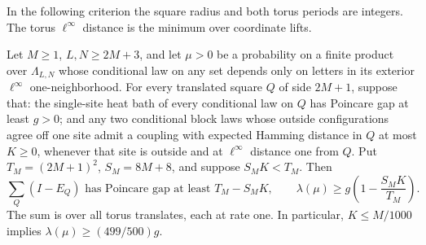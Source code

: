 In the following criterion the square radius and both torus periods
are integers.  The torus \(\ell^\infty\) distance is the minimum
over coordinate lifts.

\begin{theorem}\label{t:periodic}
Let \(M\ge1\), \(L,N\ge2M+3\), and let \(\mu>0\) be a
probability on a finite product over \(\Lambda_{L,N}\) whose
conditional law on any set depends only on letters in its exterior
\(\ell^\infty\) one-neighborhood.
For every translated square \(Q\) of side \(2M+1\), suppose that:
the single-site heat bath of every conditional law on \(Q\) has Poincare gap at least
\(g>0\); and any two conditional block laws whose outside
configurations agree off one site admit a coupling with expected
Hamming distance in \(Q\) at most \(K\ge0\), whenever that site is
outside and at \(\ell^\infty\) distance one from \(Q\).
Put \(T_M=(2M+1)^2\), \(S_M=8M+8\), and suppose \(S_MK<T_M\).
Then
\[
 \sum_{Q}(I-E_Q)\text{ has Poincare gap at least }T_M-S_MK,\qquad
 \lambda(\mu)\ge g\left(1-\frac{S_MK}{T_M}\right).
\]
The sum is over all torus translates, each at rate one.
In particular, \(K\le M/1000\) implies
\(\lambda(\mu)\ge(499/500)g\).
\end{theorem}

